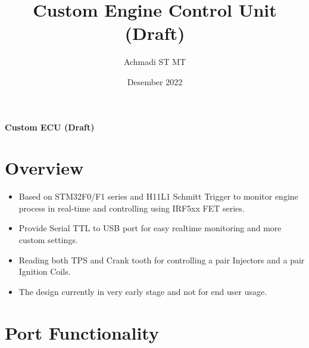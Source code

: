 \documentclass[a4paper,12pt,oneside,pdflatex,italian,final,twocolumn]{article}
\title{Custom Engine Control Unit (Draft)}
\author{Achmadi ST MT}
\date{Desember 2022}
\begin{document}
	\pagestyle{fancy}

	\chead{\today}

	\onecolumn

	\begin{figure}

	\end{figure}\begin{minipage}{0.47\textwidth}
		\centering

	\end{minipage}
	\hfill
	\begin{minipage}{0.47\textwidth}
		\raggedleft
		\Huge \textbf{Custom ECU (Draft)}
	\end{minipage}

    \section{Overview}

	\begin{itemize}
		\item Based on STM32F0/F1 series and H11L1 Schmitt Trigger to monitor engine process in real-time and controlling using IRF5xx FET series.

		\item Provide Serial TTL to USB port for easy realtime monitoring and more custom settings.

		\item Reading both TPS and Crank tooth for controlling a pair Injectors and a pair Ignition Coils.

		\item The design currently in very early stage and not for end user usage.

	\end{itemize}

    \raggedright
	\section{Port Functionality}
\end{document}
